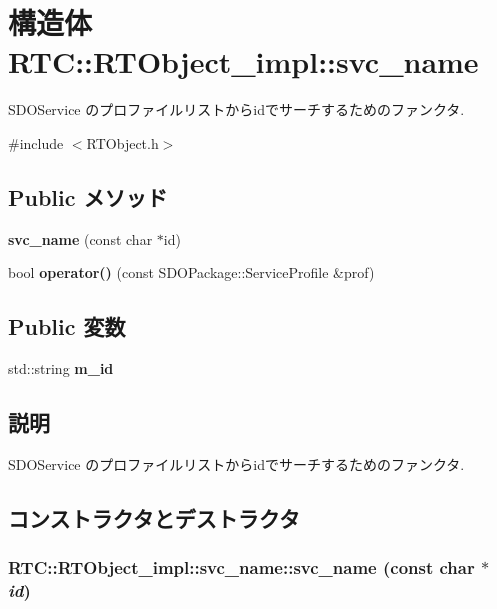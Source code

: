 \section{構造体 RTC::RTObject\_\-impl::svc\_\-name}
\label{structRTC_1_1RTObject__impl_1_1svc__name}


SDOService のプロファイルリストからidでサーチするためのファンクタ.  




{\ttfamily \#include $<$RTObject.h$>$}

\subsection*{Public メソッド}
\begin{DoxyCompactItemize}
\item 
{\bf svc\_\-name} (const char $\ast$id)
\item 
bool {\bf operator()} (const SDOPackage::ServiceProfile \&prof)
\end{DoxyCompactItemize}
\subsection*{Public 変数}
\begin{DoxyCompactItemize}
\item 
std::string {\bf m\_\-id}
\end{DoxyCompactItemize}


\subsection{説明}
SDOService のプロファイルリストからidでサーチするためのファンクタ. 

\subsection{コンストラクタとデストラクタ}
\subsubsection[{svc\_\-name}]{\setlength{\rightskip}{0pt plus 5cm}RTC::RTObject\_\-impl::svc\_\-name::svc\_\-name (const char $\ast$ {\em id})\hspace{0.3cm}{\ttfamily  [inline]}}\label{structRTC_1_1RTObject__impl_1_1svc__name_aa2ca502bbd00657d4fb5c608c36e93cd}



